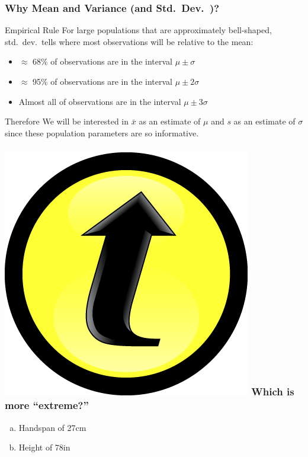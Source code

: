 \documentclass[handout]{beamer}
\begin{document}
\begin{frame}
\frametitle{Why Mean and Variance (and Std.\ Dev.\ )?}
\begin{alertblock}{Empirical Rule}
For large populations that are approximately bell-shaped, std.\ dev.\ tells where most observations will be relative to the mean:
	\begin{itemize}
		\item $\approx$ 68\% of observations are in the interval $\mu \pm \sigma$
		\item $\approx$ 95\% of observations are in the interval $\mu \pm 2\sigma$
		\item Almost all of observations are in the interval $\mu \pm 3\sigma$
	\end{itemize}
\end{alertblock}
\pause

\begin{block}{Therefore}
We will be interested in $\bar{x}$ as an estimate of $\mu$ and $s$ as an estimate of $\sigma$ since these population parameters are so informative.
\end{block}
\end{frame}
\begin{frame}

\frametitle{\includegraphics[scale = 0.05]{./images/clicker} \hfill Which is more ``extreme?''}
	\begin{enumerate}[(a)]
		\item Handspan of 27cm
		\item Height of 78in
	\end{enumerate}

\end{frame}
\end{document}
